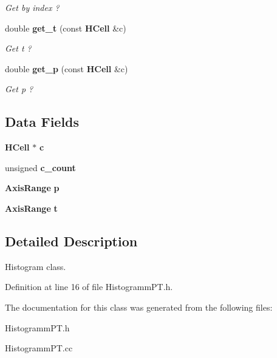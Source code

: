 \begin{DoxyCompactItemize}
\begin{DoxyCompactList}\small\item\em Get by index ? \item\end{DoxyCompactList}\item 
double {\bf get\_\-t} (const {\bf HCell} \&c)\label{classHistogrammPT_a3649641c88c82a93e12339a21de0379d}

\begin{DoxyCompactList}\small\item\em Get t ? \item\end{DoxyCompactList}\item 
double {\bf get\_\-p} (const {\bf HCell} \&c)\label{classHistogrammPT_ac979daa0f17d147c523e2e927617738e}

\begin{DoxyCompactList}\small\item\em Get p ? \item\end{DoxyCompactList}\end{DoxyCompactItemize}
\subsection*{Data Fields}
\begin{DoxyCompactItemize}
\item 
{\bf HCell} $\ast$ {\bfseries c}\label{classHistogrammPT_a7ef98513afbbef61a4a764082dec2dc2}

\item 
unsigned {\bfseries c\_\-count}\label{classHistogrammPT_a253cf428378cf4d9b11aac5344a4e5ed}

\item 
{\bf AxisRange} {\bfseries p}\label{classHistogrammPT_a785c1c78da66f092a60351a39e9661bb}

\item 
{\bf AxisRange} {\bfseries t}\label{classHistogrammPT_a35d3ffa3da74524aeb263212286d2988}

\end{DoxyCompactItemize}


\subsection{Detailed Description}
Histogram class. 

Definition at line 16 of file HistogrammPT.h.

The documentation for this class was generated from the following files:\begin{DoxyCompactItemize}
\item 
HistogrammPT.h\item 
HistogrammPT.cc\end{DoxyCompactItemize}
